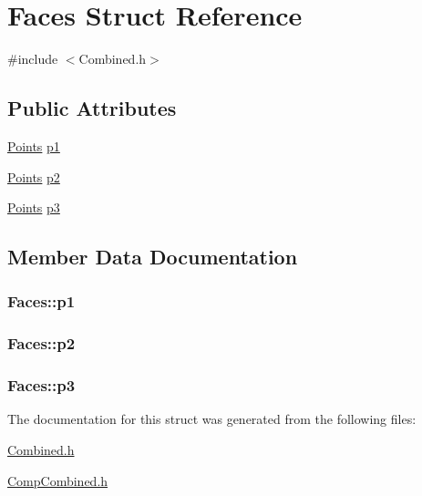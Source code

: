 \hypertarget{structFaces}{\section{Faces Struct Reference}
\label{structFaces}
}


{\ttfamily \#include $<$Combined.\-h$>$}

\subsection*{Public Attributes}
\begin{DoxyCompactItemize}
\item 
\hyperlink{structPoints}{Points} \hyperlink{structFaces_affa54ad811780dcb36b758062292796d}{p1}
\item 
\hyperlink{structPoints}{Points} \hyperlink{structFaces_a9ea0191a28ddad90a266c2c290f565b3}{p2}
\item 
\hyperlink{structPoints}{Points} \hyperlink{structFaces_a25826f1e127e8f799ba33d3daaa2589b}{p3}
\end{DoxyCompactItemize}


\subsection{Member Data Documentation}
\hypertarget{structFaces_affa54ad811780dcb36b758062292796d}{
\subsubsection[{p1}]{ Faces\-::p1}}\label{structFaces_affa54ad811780dcb36b758062292796d}
\hypertarget{structFaces_a9ea0191a28ddad90a266c2c290f565b3}{
\subsubsection[{p2}]{ Faces\-::p2}}\label{structFaces_a9ea0191a28ddad90a266c2c290f565b3}
\hypertarget{structFaces_a25826f1e127e8f799ba33d3daaa2589b}{
\subsubsection[{p3}]{ Faces\-::p3}}\label{structFaces_a25826f1e127e8f799ba33d3daaa2589b}


The documentation for this struct was generated from the following files\-:\begin{DoxyCompactItemize}
\item 
\hyperlink{Combined_8h}{Combined.\-h}\item 
\hyperlink{CompCombined_8h}{Comp\-Combined.\-h}\end{DoxyCompactItemize}
